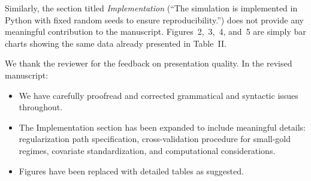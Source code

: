 Similarly, the section titled \emph{Implementation} (``The simulation is implemented in Python with fixed random seeds to ensure reproducibility.'') does not provide any meaningful contribution to the manuscript. Figures~2,~3,~4, and~5 are simply bar charts showing the same data already presented in Table~II.

{\color{blue}
We thank the reviewer for the feedback on presentation quality. In the revised manuscript:
\begin{itemize}
\item We have carefully proofread and corrected grammatical and syntactic issues throughout.
\item The Implementation section has been expanded to include meaningful details: regularization path specification, cross-validation procedure for small-gold regimes, covariate standardization, and computational considerations.
\item Figures have been replaced with detailed tables as suggested.
\end{itemize}
}


\clearpage
